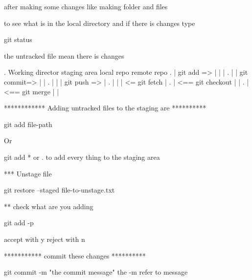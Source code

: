 after making some changes like making folder and files 

to see what is in the local directory and if there is changes type 

git status 

the untracked file mean there is changes 

. Working director       staging area      local repo        remote repo 
.        |   git add =>        |                |                  |
.        |                     | git commit=>   |                  |
.        |                     |                |   git push =>    |         
.        |                     |                |   <= git fetch   |
.        |              <== git checkout        |                  |
.        |               <==  git merge         |                  |


************  Adding untracked files to the staging are **********

git add file-path 

Or  

git add *   or .   to add every thing to the staging area 

*** Unstage file  

git restore --staged  file-to-unstage.txt

** check what are you adding 

git add -p 

accept with y  reject with n 

*********** commit these changes **********

git commit -m "the commit message"
  the -m refer to message   